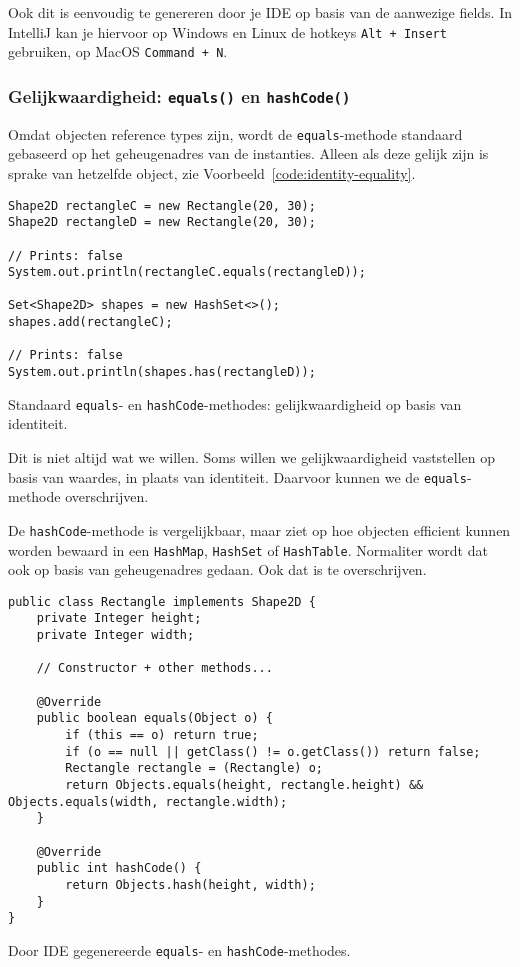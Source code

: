 Ook dit is eenvoudig te genereren door je IDE op basis van de aanwezige fields.
In IntelliJ kan je hiervoor op Windows en Linux de hotkeys \texttt{Alt + Insert} gebruiken, 
op MacOS \texttt{Command + N}.

\subsubsection{Gelijkwaardigheid: \texttt{equals()} en \texttt{hashCode()}}
Omdat objecten reference types zijn, wordt de \texttt{equals}-methode standaard gebaseerd 
op het geheugenadres van de instanties. Alleen als deze gelijk zijn is sprake van 
hetzelfde object, zie Voorbeeld~\ref{code:identity-equality}.

\begin{listing}[H]
\begin{verbatim}
Shape2D rectangleC = new Rectangle(20, 30);
Shape2D rectangleD = new Rectangle(20, 30);

// Prints: false
System.out.println(rectangleC.equals(rectangleD));

Set<Shape2D> shapes = new HashSet<>();
shapes.add(rectangleC);

// Prints: false
System.out.println(shapes.has(rectangleD));

\end{verbatim}
\caption{Standaard \texttt{equals}- en \texttt{hashCode}-methodes: 
gelijkwaardigheid op basis van identiteit.}
\label{code:identity-equality}
\end{listing}

Dit is niet altijd wat we willen. Soms willen we gelijkwaardigheid
vaststellen op basis van waardes, in plaats van identiteit. Daarvoor kunnen we 
de \texttt{equals}-methode overschrijven.

De \texttt{hashCode}-methode is vergelijkbaar, maar ziet op hoe objecten 
efficient kunnen worden bewaard in 
een \texttt{HashMap}, \texttt{HashSet} of \texttt{HashTable}.
Normaliter wordt dat ook op basis van geheugenadres gedaan. Ook dat is te overschrijven.

\begin{listing}[H]
\begin{verbatim}
public class Rectangle implements Shape2D {
    private Integer height;
    private Integer width;

    // Constructor + other methods...

    @Override
    public boolean equals(Object o) {
        if (this == o) return true;
        if (o == null || getClass() != o.getClass()) return false;
        Rectangle rectangle = (Rectangle) o;
        return Objects.equals(height, rectangle.height) && Objects.equals(width, rectangle.width);
    }

    @Override
    public int hashCode() {
        return Objects.hash(height, width);
    }
}
\end{verbatim}
\caption{Door IDE gegenereerde \texttt{equals}- en \texttt{hashCode}-methodes.}
\label{code:hashcode-equals}
\end{listing}

